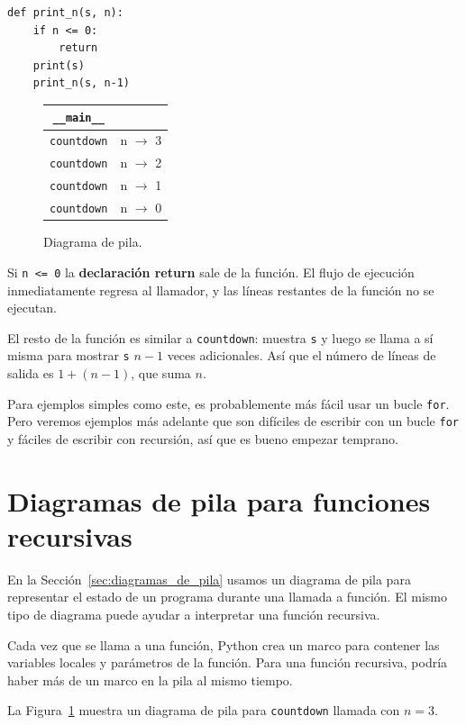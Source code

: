 \begin{lstlisting}
def print_n(s, n):
    if n <= 0:
        return
    print(s)
    print_n(s, n-1)
\end{lstlisting}

\begin{figure}[h]
\centering
\begin{tabular}{|c|c|}
\hline
\texttt{\_\_main\_\_} & \phantom{n $\rightarrow$ 3} \\
\hline
\texttt{countdown} & n $\rightarrow$ 3 \\
\hline
\texttt{countdown} & n $\rightarrow$ 2 \\
\hline
\texttt{countdown} & n $\rightarrow$ 1 \\
\hline
\texttt{countdown} & n $\rightarrow$ 0 \\
\hline
\end{tabular}
\caption{Diagrama de pila.}
\label{fig:diagrama_de_pila}
\end{figure}

Si \texttt{n <= 0} la \textbf{declaración return} sale de la función. El flujo de ejecución inmediatamente regresa al llamador, y las líneas restantes de la función no se ejecutan.

El resto de la función es similar a \texttt{countdown}: muestra \texttt{s} y luego se llama a sí misma para mostrar \texttt{s} $n-1$ veces adicionales. Así que el número de líneas de salida es $1 + (n-1)$, que suma $n$.

Para ejemplos simples como este, es probablemente más fácil usar un bucle \texttt{for}. Pero veremos ejemplos más adelante que son difíciles de escribir con un bucle \texttt{for} y fáciles de escribir con recursión, así que es bueno empezar temprano.

\section{Diagramas de pila para funciones recursivas}

En la Sección~\ref{sec:diagramas_de_pila} usamos un diagrama de pila para representar el estado de un programa durante una llamada a función. El mismo tipo de diagrama puede ayudar a interpretar una función recursiva.

Cada vez que se llama a una función, Python crea un marco para contener las variables locales y parámetros de la función. Para una función recursiva, podría haber más de un marco en la pila al mismo tiempo.

La Figura~\ref{fig:diagrama_de_pila} muestra un diagrama de pila para \texttt{countdown} llamada con $n = 3$.

